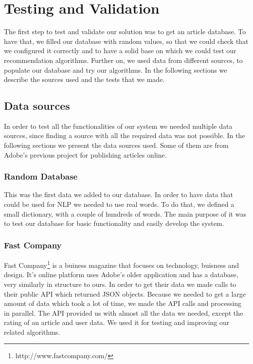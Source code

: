 \chapter{Testing and Validation}
\label{chapter:testing-validation}

The first step to test and validate our solution was to get an article database. To have that, we filled our database with random values, so that we could check that we configured it correctly and to have a solid base on which we could test our recommendation algorithms.
Further on, we used data from different sources, to populate our database and try our algorithms.
In the following sections we describe the sources used and the tests that we made.

\section{Data sources} 
\label{sec:testing-and-validation-data-sources}
In order to test all the functionalities of our system we needed multiple data sources, since finding a source with all the required data was not possible.
In the following sections we present the data sources used. Some of them are from Adobe's previous project for publishing articles online.

\subsection{Random Database} 
\label{sec:testing-and-validation-data-sources-random-database}
This was the first data we added to our database.
In order to have data that could be used for NLP we needed to use real words. To do that, we defined a small dictionary, with a couple of hundreds of words.
The main purpose of it was to test our database for basic functionality and easily develop the system.

\subsection{Fast Company} 
\label{sec:testing-and-validation-data-sources-fast-company}
Fast Company\footnote{http://www.fastcompany.com/} is a buiness magazine that focuses on technology, buisness and design. It's online platform uses Adobe's older application and has a database, very similarly in structure to ours.
In order to get their data we made calls to their public API which returned JSON objects. Because we needed to get a large amount of data which took a lot of time, we made the API calls and processing in parallel. The API provided us with almost all the data we needed, except the rating of an article and user data. We used it for testing and improving our related algorithms.

